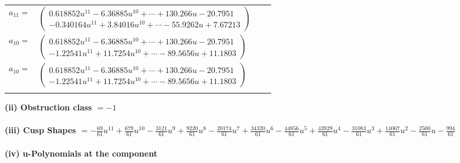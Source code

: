 \documentclass[1p]{elsarticle_modified}
\theoremstyle{definition}
\begin{document}
\begin{tabular}{m{7pt} m{180pt} m{7pt} m{180pt} }
\flushright $a_{11}=$&$\begin{pmatrix}0.618852 u^{11}-6.36885 u^{10}+\cdots+130.266 u-20.7951\\-0.340164 u^{11}+3.84016 u^{10}+\cdots-55.9262 u+7.67213\end{pmatrix}$ \\
\flushright $a_{10}=$&$\begin{pmatrix}0.618852 u^{11}-6.36885 u^{10}+\cdots+130.266 u-20.7951\\-1.22541 u^{11}+11.7254 u^{10}+\cdots-89.5656 u+11.1803\end{pmatrix}$\\ \flushright $a_{10}=$&$\begin{pmatrix}0.618852 u^{11}-6.36885 u^{10}+\cdots+130.266 u-20.7951\\-1.22541 u^{11}+11.7254 u^{10}+\cdots-89.5656 u+11.1803\end{pmatrix}$\\&\end{tabular}
\flushleft \textbf{(ii) Obstruction class $= -1$}\\~\\
\flushleft \textbf{(iii) Cusp Shapes $= -\frac{69}{61} u^{11}+\frac{679}{61} u^{10}-\frac{3121}{61} u^9+\frac{9220}{61} u^8-\frac{20174}{61} u^7+\frac{34320}{61} u^6-\frac{44856}{61} u^5+\frac{43929}{61} u^4-\frac{31083}{61} u^3+\frac{14067}{61} u^2-\frac{2500}{61} u-\frac{994}{61}$}\\~\\
\newpage\renewcommand{\arraystretch}{1}
\flushleft \textbf{(iv) u-Polynomials at the component}\newline \\
\end{document}
